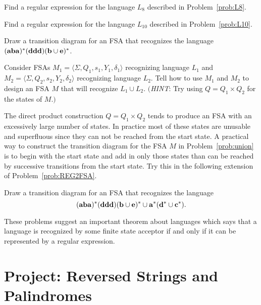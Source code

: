 \begin{prb}
Find a regular expression for the language $L_8$ described in Problem~\ref{prob:L8}.
\end{prb}

\begin{prb}
Find a regular expression for the language $L_{10}$ described in Problem~\ref{prob:L10}.
\end{prb}

\begin{prb}\label{prob:REG2FSA}
Draw a transition diagram for an FSA that recognizes the language $(\mathbf a\mathbf b\mathbf a)^*(\mathbf d\mathbf d\mathbf d)(\mathbf b\cup \mathbf e)^*$.
\end{prb}

\begin{prb}\label{prob:union}
Consider FSAs $M_1 = \langle \Sigma,Q_1,s_1,Y_1,\delta_1\rangle$ recognizing language $L_1$ and $M_2 = \langle \Sigma,Q_2,s_2,Y_2,\delta_2\rangle$ recognizing language $L_2$.   Tell how to use $M_1$ and $M_2$ to design an FSA $M$ that will recognize $L_1\cup L_2$.   $($\emph{HINT}: Try using $Q=Q_1\times Q_2$ for the states of $M$.$)$
\end{prb}

The direct product construction $Q = Q_1\times Q_2$ tends to produce an FSA with an excessively large number of states.  In practice most of these states are unusable and superfluous since they can not be reached from the start state.  A practical way to construct the transition diagram for the FSA $M$ in Problem~\ref{prob:union} is to begin with the start state and add in only those states than can be reached by successive transitions from the start state.  Try this in the following extension of Problem~\ref{prob:REG2FSA}.

\begin{prb}
Draw a transition diagram for an FSA that recognizes the language
\[
 (\mathbf a\mathbf b\mathbf a)^*(\mathbf d\mathbf d\mathbf d)(\mathbf b\cup \mathbf e)^* \cup \mathbf a^*(\mathbf d^*\cup \mathbf c^*).
\]
\end{prb}

These problems suggest an important theorem about languages which says that a language is recognized by some finite state acceptor if and only if it can be represented by a regular expression.



\section{Project:  Reversed Strings and Palindromes}

